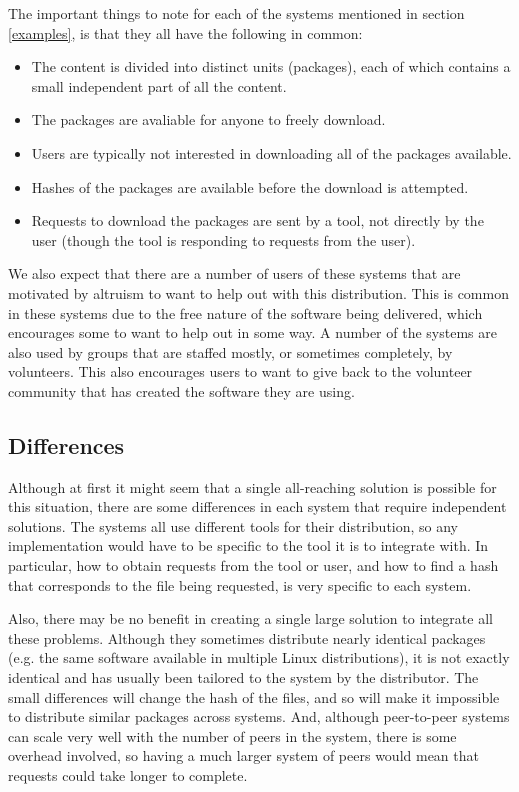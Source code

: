 \documentclass[conference]{IEEEtran}
\begin{document}
The important things to note for each of the systems mentioned in
section \ref{examples}, is that they all have the following in
common:
\begin{itemize}
 \item The content is divided into distinct units (packages), each
       of which contains a small independent part of all the
       content.
 \item The packages are avaliable for anyone to freely download.
 \item Users are typically not interested in downloading all of the
       packages available.
 \item Hashes of the packages are available before the download is
       attempted.
 \item Requests to download the packages are sent by a tool, not
       directly by the user (though the tool is responding to
       requests from the user).
\end{itemize}

We also expect that there are a number of users of these systems
that are motivated by altruism to want to help out with this
distribution. This is common in these systems due to the free nature
of the software being delivered, which encourages some to want to
help out in some way. A number of the systems are also used by
groups that are staffed mostly, or sometimes completely, by
volunteers. This also encourages users to want to give back
to the volunteer community that has created the software they are
using.

\subsection{Differences}
\label{differences}

Although at first it might seem that a single all-reaching solution
is possible for this situation, there are some differences in each
system that require independent solutions. The systems all use
different tools for their distribution, so any implementation would
have to be specific to the tool it is to integrate with. In
particular, how to obtain requests from the tool or user, and how to
find a hash that corresponds to the file being requested, is very
specific to each system.

Also, there may be no benefit in creating a single large solution to
integrate all these problems. Although they sometimes distribute
nearly identical packages (e.g. the same software available in
multiple Linux distributions), it is not exactly identical and has
usually been tailored to the system by the distributor. The small
differences will change the hash of the files, and so will make it
impossible to distribute similar packages across systems. And,
although peer-to-peer systems can scale very well with the number of
peers in the system, there is some overhead involved, so having a
much larger system of peers would mean that requests could take
longer to complete.
\end{document}
